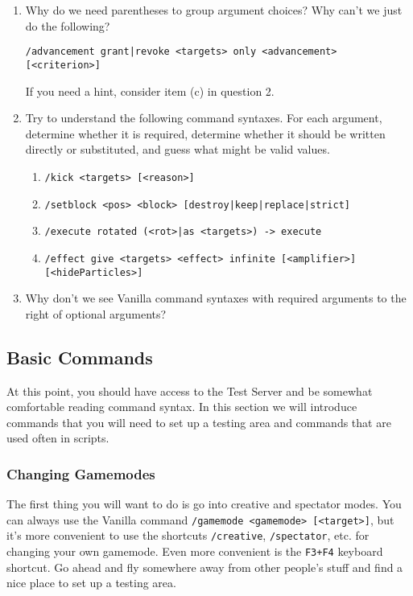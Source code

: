 \documentclass[oneside]{book}
\begin{document}
\begin{thinkbox}
    \begin{enumerate}
        \item Why do we need parentheses to group argument choices? Why can't we just do the following?
        \begin{verbatim}
/advancement grant|revoke <targets> only <advancement> [<criterion>]\end{verbatim} 
        If you need a hint, consider item (c) in question 2.
        \item Try to understand the following command syntaxes. For each argument, determine whether it is required, determine whether it should be written directly or substituted, and guess what might be valid values.
        \begin{enumerate}
            \item \texttt{/kick <targets> [<reason>]}
            \item \texttt{/setblock <pos> <block> [destroy|keep|replace|strict]}
            \item \texttt{/execute rotated (<rot>|as <targets>) -> execute}
            \item \texttt{/effect give <targets> <effect> infinite [<amplifier>]} \\
            \texttt{[<hideParticles>]}
        \end{enumerate}
        \item Why don't we see Vanilla command syntaxes with required arguments to the right of optional arguments?
    \end{enumerate}
\end{thinkbox}

\subsection{Basic Commands}

At this point, you should have access to the Test Server and be somewhat comfortable reading command syntax. In this section we will introduce commands that you will need to set up a testing area and commands that are used often in scripts.

\subsubsection*{Changing Gamemodes}

The first thing you will want to do is go into creative and spectator modes. You can always use the Vanilla command \texttt{/gamemode <gamemode> [<target>]}, but it's more convenient to use the shortcuts \texttt{/creative}, \texttt{/spectator}, etc. for changing your own gamemode. Even more convenient is the \texttt{F3+F4} keyboard shortcut. Go ahead and fly somewhere away from other people's stuff and find a nice place to set up a testing area.
\end{document}
